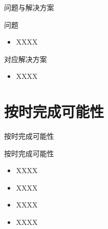 \begin{frame}{问题与解决方案}
    \begin{block}{问题}
      \begin{itemize}
        \item XXXX
      \end{itemize}
    \end{block}
    \begin{block}{对应解决方案}
      \begin{itemize}
        \item XXXX
      \end{itemize}
    \end{block}
  \end{frame}
  
  \section{按时完成可能性}
  
  \begin{frame}{按时完成可能性}
    \begin{block}{按时完成可能性}
      \begin{itemize}
        \setlength{\itemsep}{6pt}
        \item XXXX\cite{xin1994}
        \item XXXX\cite{zhai2015}
        \item XXXX\cite{jones2004}
        \item XXXX\cite{mcmahan2005}
      \end{itemize}
    \end{block}
  \end{frame}
